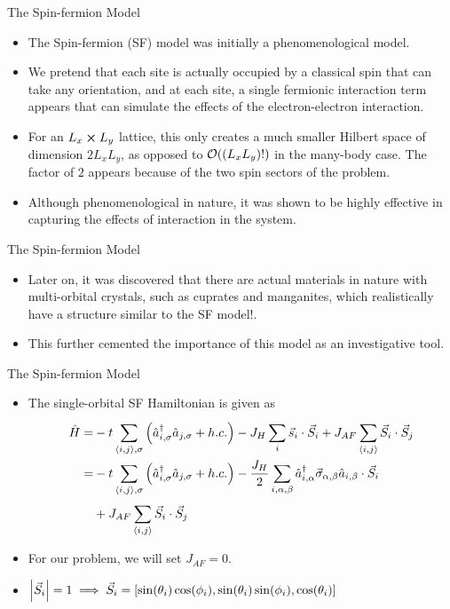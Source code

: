 \documentclass[]{beamer}
\newcommand{\ahat}{\hat{a}}
\newcommand{\ahatd}{\hat{a}^{\dagger}}
\newcommand{\ham}{\hat{H}}
\newcommand{\slims}[2]{\sum\limits_{#1}^{#2}}
\begin{document}
\begin{frame}{The Spin-fermion Model}
\begin{itemize}
	\item The Spin-fermion (SF) model was initially a phenomenological model.
	\item We pretend that each site is actually occupied by a classical spin that can take any orientation, and at each site, a single fermionic interaction term appears that can simulate the effects of the electron-electron interaction.
	\item For an $ L_x \cross L_y $ lattice, this only creates a much smaller Hilbert space of dimension $ 2 L_x L_y $, as opposed to $ \order{(L_x L_y)!} $ in the many-body case. The factor of $ 2 $ appears because of the two spin sectors of the problem.
	\item Although phenomenological in nature, it was shown to be highly effective in capturing the effects of interaction in the system.
\end{itemize}
\end{frame}

\begin{frame}{The Spin-fermion Model}
\begin{itemize}
	\item Later on, it was discovered that there are actual materials in nature with multi-orbital crystals, such as cuprates and manganites, which realistically have a structure similar to the SF model!\cite{dagotto_2011}.
	\item This further cemented the importance of this model as an investigative tool.
\end{itemize}
\end{frame}

\begin{frame}{The Spin-fermion Model}
\begin{itemize}
	\item The single-orbital SF Hamiltonian is given as
	\begin{align}
	\nonumber
	\ham =& -t \slims{\expval{i,j},\sigma}{} \left( {\ahatd}_{i,\sigma} {\ahat}_{j,\sigma} + h.c. \right) - J_H \slims{i}{} \vec{s}_i \cdot \vec{S}_i + J_{AF} \slims{\expval{i,j}}{} \vec{S}_i \cdot \vec{S}_j\\
	\nonumber
	=& -t \slims{\expval{i,j},\sigma}{} \left( {\ahatd}_{i,\sigma} {\ahat}_{j,\sigma} + h.c. \right) - \frac{J_H}{2} \slims{i, \alpha, \beta}{} \ahatd_{i,\alpha} \vec{\sigma}_{\alpha, \beta} \ahat_{i, \beta}  \cdot \vec{S}_i \\
	&+ J_{AF} \slims{\expval{i,j}}{} \vec{S}_i \cdot \vec{S}_j
	\end{align}
	\item For our problem, we will set $ J_{AF} = 0 $.
	\item $ \abs{\vec{S}_i} = 1 \implies \vec{S}_i = \left[\sin(\theta_i) \cos(\phi_i), \sin(\theta_i) \sin(\phi_i), \cos(\theta_i) \right] $
\end{itemize}
\end{frame}
\end{document}
